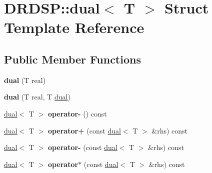 \hypertarget{struct_d_r_d_s_p_1_1dual}{\section{D\-R\-D\-S\-P\-:\-:dual$<$ T $>$ Struct Template Reference}
\label{struct_d_r_d_s_p_1_1dual}
}
\subsection*{Public Member Functions}
\begin{DoxyCompactItemize}
\item 
\hypertarget{struct_d_r_d_s_p_1_1dual_a8169a404e5a23d3659ad64aaf277fb6f}{{\bfseries dual} (T real)}\label{struct_d_r_d_s_p_1_1dual_a8169a404e5a23d3659ad64aaf277fb6f}

\item 
\hypertarget{struct_d_r_d_s_p_1_1dual_a86ae3acecf82009679f1ea3c422728e9}{{\bfseries dual} (T real, T \hyperlink{struct_d_r_d_s_p_1_1dual}{dual})}\label{struct_d_r_d_s_p_1_1dual_a86ae3acecf82009679f1ea3c422728e9}

\item 
\hypertarget{struct_d_r_d_s_p_1_1dual_a269257910dad7487cfe6b7f695585d39}{\hyperlink{struct_d_r_d_s_p_1_1dual}{dual}$<$ T $>$ {\bfseries operator-\/} () const }\label{struct_d_r_d_s_p_1_1dual_a269257910dad7487cfe6b7f695585d39}

\item 
\hypertarget{struct_d_r_d_s_p_1_1dual_ab18cda06a306a0bb97deabac1a8fd1ae}{\hyperlink{struct_d_r_d_s_p_1_1dual}{dual}$<$ T $>$ {\bfseries operator+} (const \hyperlink{struct_d_r_d_s_p_1_1dual}{dual}$<$ T $>$ \&rhs) const }\label{struct_d_r_d_s_p_1_1dual_ab18cda06a306a0bb97deabac1a8fd1ae}

\item 
\hypertarget{struct_d_r_d_s_p_1_1dual_a7f066ea6def9c0af3081a265543e402a}{\hyperlink{struct_d_r_d_s_p_1_1dual}{dual}$<$ T $>$ {\bfseries operator-\/} (const \hyperlink{struct_d_r_d_s_p_1_1dual}{dual}$<$ T $>$ \&rhs) const }\label{struct_d_r_d_s_p_1_1dual_a7f066ea6def9c0af3081a265543e402a}

\item 
\hypertarget{struct_d_r_d_s_p_1_1dual_a263a4cfe97ce6f8f272b28a9ad297c90}{\hyperlink{struct_d_r_d_s_p_1_1dual}{dual}$<$ T $>$ {\bfseries operator$\ast$} (const \hyperlink{struct_d_r_d_s_p_1_1dual}{dual}$<$ T $>$ \&rhs) const }\label{struct_d_r_d_s_p_1_1dual_a263a4cfe97ce6f8f272b28a9ad297c90}


\end{DoxyCompactItemize}
